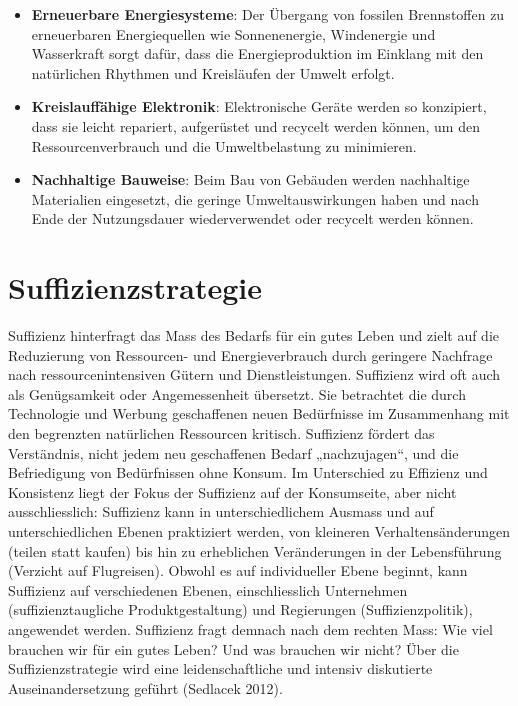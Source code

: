 \documentclass[
  nswissgerman,
  a4paper,
  DIV=11,
  numbers=noendperiod,
  oneside,
  openany]{scrreprt}
\providecommand{\tightlist}{%
  \setlength{\itemsep}{0pt}\setlength{\parskip}{0pt}}
\begin{document}
\begin{tcolorbox}[enhanced jigsaw, arc=.35mm, bottomrule=.15mm, bottomtitle=1mm, breakable, colback=white, colbacktitle=quarto-callout-tip-color!10!white, colframe=quarto-callout-tip-color-frame, coltitle=black, left=2mm, leftrule=.75mm, opacityback=0, opacitybacktitle=0.6, rightrule=.15mm, title={Beispiele Konsistenzstrategie}, titlerule=0mm, toprule=.15mm, toptitle=1mm]

\begin{itemize}
\tightlist
\item
  \textbf{Erneuerbare Energiesysteme}: Der Übergang von fossilen
  Brennstoffen zu erneuerbaren Energiequellen wie Sonnenenergie,
  Windenergie und Wasserkraft sorgt dafür, dass die Energieproduktion im
  Einklang mit den natürlichen Rhythmen und Kreisläufen der Umwelt
  erfolgt.
\item
  \textbf{Kreislauffähige Elektronik}: Elektronische Geräte werden so
  konzipiert, dass sie leicht repariert, aufgerüstet und recycelt werden
  können, um den Ressourcenverbrauch und die Umweltbelastung zu
  minimieren.
\item
  \textbf{Nachhaltige Bauweise}: Beim Bau von Gebäuden werden
  nachhaltige Materialien eingesetzt, die geringe Umweltauswirkungen
  haben und nach Ende der Nutzungsdauer wiederverwendet oder recycelt
  werden können.
\end{itemize}

\end{tcolorbox}

\section{Suffizienzstrategie}\label{suffizienzstrategie}

Suffizienz hinterfragt das Mass des Bedarfs für ein gutes Leben und
zielt auf die Reduzierung von Ressourcen- und Energieverbrauch durch
geringere Nachfrage nach ressourcenintensiven Gütern und
Dienstleistungen. Suffizienz wird oft auch als Genügsamkeit oder
Angemessenheit übersetzt. Sie betrachtet die durch Technologie und
Werbung geschaffenen neuen Bedürfnisse im Zusammenhang mit den
begrenzten natürlichen Ressourcen kritisch. Suffizienz fördert das
Verständnis, nicht jedem neu geschaffenen Bedarf „nachzujagen``, und die
Befriedigung von Bedürfnissen ohne Konsum. Im Unterschied zu Effizienz
und Konsistenz liegt der Fokus der Suffizienz auf der Konsumseite, aber
nicht ausschliesslich: Suffizienz kann in unterschiedlichem Ausmass und
auf unterschiedlichen Ebenen praktiziert werden, von kleineren
Verhaltensänderungen (teilen statt kaufen) bis hin zu erheblichen
Veränderungen in der Lebensführung (Verzicht auf Flugreisen). Obwohl es
auf individueller Ebene beginnt, kann Suffizienz auf verschiedenen
Ebenen, einschliesslich Unternehmen (suffizienztaugliche
Produktgestaltung) und Regierungen (Suffizienzpolitik), angewendet
werden. Suffizienz fragt demnach nach dem rechten Mass: Wie viel
brauchen wir für ein gutes Leben? Und was brauchen wir nicht? Über die
Suffizienzstrategie wird eine leidenschaftliche und intensiv diskutierte
Auseinandersetzung geführt (Sedlacek 2012).
\end{document}
